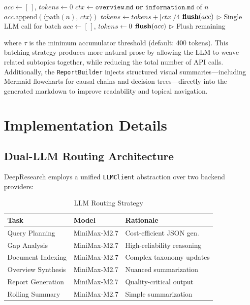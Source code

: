 \documentclass[conference]{IEEEtran}
\begin{document}
\begin{algorithm}[H]
\caption{Accumulator-Based Lazy LLM Synthesis}
\begin{algorithmic}[1]
\STATE $acc \gets [\,]$, \quad $tokens \gets 0$
    \STATE $ctx \gets \texttt{overview.md}$ \textbf{or} $\texttt{information.md}$ of $n$
        \STATE $acc\text{.append}\!\left(\langle\text{path}(n),\, ctx\rangle\right)$
        \STATE $tokens \gets tokens + \lvert ctx \rvert / 4$
            \STATE $\text{\textbf{flush}}(acc)$ $\triangleright$ Single LLM call for batch
            \STATE $acc \gets [\,]$, \quad $tokens \gets 0$
        \ENDIF
    \ENDIF
\ENDFOR
{}
    \STATE $\text{\textbf{flush}}(acc)$ $\triangleright$ Flush remaining
\ENDIF
\end{algorithmic}
\end{algorithm}

where $\tau$ is the minimum accumulator threshold (default: 400 tokens). This batching strategy produces more natural prose by allowing the LLM to weave related subtopics together, while reducing the total number of API calls. Additionally, the \texttt{ReportBuilder} injects structured visual summaries---including Mermaid flowcharts for causal chains and decision trees---directly into the generated markdown to improve readability and topical navigation.

\section{Implementation Details}

\subsection{Dual-LLM Routing Architecture}

DeepResearch employs a unified \texttt{LLMClient} abstraction over two backend providers:

\begin{table}[htbp]
\caption{LLM Routing Strategy}
\label{tab:llm_routing}
\centering
\scriptsize
\begin{tabular}{@{}lll@{}}
\toprule
\textbf{Task} & \textbf{Model} & \textbf{Rationale} \\
\midrule
Query Planning & MiniMax-M2.7 & Cost-efficient JSON gen. \\
Gap Analysis & MiniMax-M2.7 & High-reliability reasoning \\
Document Indexing & MiniMax-M2.7 & Complex taxonomy updates \\
Overview Synthesis & MiniMax-M2.7 & Nuanced summarization \\
Report Generation & MiniMax-M2.7 & Quality-critical output \\
Rolling Summary & MiniMax-M2.7 & Simple summarization \\
\bottomrule
\end{tabular}
\end{table}
\end{document}
